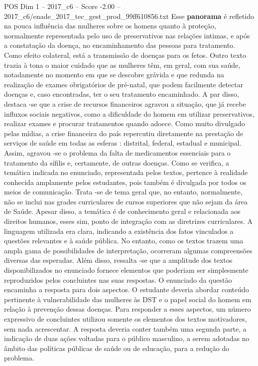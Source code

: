 \begin{textsample}{POS Dim 1 – 2017\_c6 – Score -2.00 – 2017\_c6/enade\_2017\_tec\_gest\_prod\_99ff610856.txt}
Esse \textbf{panorama} é refletido na pouca influência das mulheres sobre os homens quanto à proteção, normalmente representada pelo uso de preservativos nas relações intimas, e após a constatação da doença, no encaminhamento das pessoas para tratamento.
Como efeito colateral, está a transmissão de doenças para os fetos.
Outro texto trazia à tona o maior cuidado que as mulheres têm, em geral, com sua saúde, notadamente no momento em que se descobre grávida e que redunda na realização de exames obrigatórios de pré-natal, que podem facilmente detectar doenças e, caso encontradas, ter o seu tratamento encaminhado.
A par disso, destaca -se que a crise de recursos financeiros agravou a situação, que já recebe influxos sociais negativos, como a dificuldade do homem em utilizar preservativos, realizar exames e procurar tratamentos quando adoece.
Como muito divulgado pelas mídias, a crise financeira do país repercutiu diretamente na prestação de serviços de saúde em todas as esferas : distrital, federal, estadual e municipal.
Assim, agravou -se o problema da falta de medicamentos essenciais para o tratamento da sífilis e, certamente, de outras doenças.
Como se verifica, a temática indicada no enunciado, representada pelos textos, pertence à realidade conhecida amplamente pelos estudantes, pois também é divulgada por todos os meios de comunicação.
Trata -se de tema geral que, no entanto, normalmente, não se inclui nas grades curriculares de cursos superiores que não sejam da área de Saúde.
Apesar disso, a temática é de conhecimento geral e relacionada aos direitos humanos, esses sim, ponto de integração com as diretrizes curriculares.
A linguagem utilizada era clara, indicando a existência dos fatos vinculados a questões relevantes e à saúde pública.
No entanto, como os textos trazem uma ampla gama de possibilidades de interpretação, ocorreram algumas compreensões diversas das esperadas.
Além disso, ressalta -se que a amplitude dos textos disponibilizados no enunciado fornece elementos que poderiam ser simplesmente reproduzidos pelos concluintes nas suas respostas.
O enunciado da questão encaminha a resposta para dois aspectos.
O estudante deveria abordar conteúdo pertinente à vulnerabilidade das mulheres às DST e o papel social do homem em relação à prevenção dessas doenças.
Para responder a esses aspectos, um número expressivo de concluintes utilizou somente os elementos dos textos motivadores, sem nada acrescentar.
A resposta deveria conter também uma segunda parte, a indicação de duas ações voltadas para o público masculino, a serem adotadas no âmbito das políticas públicas de saúde ou de educação, para a redução do problema.

\end{textsample}
